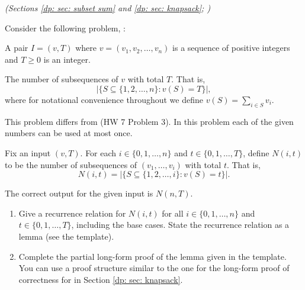 \documentclass[11pt]{article}
\begin{document}
\gradescopeInit






\newpage 

\problem\emph{(Sections \ref{dp: sec: subset sum} and \ref{dp: sec: knapsack}; )}

Consider the following problem, :

\begin{mylist}
\item[\bf input:] A pair $I=(v, T)$ where $v=(v_1, v_2, \ldots, v_n)$ is a sequence
  of positive integers and $T\ge 0$ is an integer.

\item[\bf output:]
  The number of subsequences of $v$ with total $T$.  That is,
  \[\Big|\big\{ S\subseteq\{1,2,\ldots,n\} : v(S) = T\big\}\Big|,\]
  where for notational convenience throughout we define
  $v(S) = \sum_{i\in S} v_i$.
\end{mylist}

This problem differs from  (HW 7 Problem 3).
In this problem each of the given numbers can be used at most once.

\bigskip

Fix an input $(v, T)$.   For each $i\in\{0, 1,\ldots, n\}$ and $t\in\{0,1,\ldots,T\}$,
define $N(i, t)$ to be the number of subsequences of $(v_1, \ldots, v_i)$ with total $t$.
That is, 
\[N(i, t) = \Big|\big\{ S\subseteq\{1,2,\ldots,i\} : v(S) = t\big\}\Big|.\]

The correct output for the given input is $N(n, T)$.

\begin{enumerate}[label=(\alph*)]

\item
  Give a recurrence relation for $N(i, t)$ for all $i\in\{0,1,\ldots,n\}$ and $t\in\{0,1,\ldots, T\}$,
  including the base cases.
  State the recurrence relation as a lemma (see the template).

\item
  Complete the partial long-form proof of the lemma given in the template.
  You can use a proof structure similar to the one for the long-form proof of correctness for  in Section \ref{dp: sec: knapsack}.

\end{enumerate}
\end{document}

